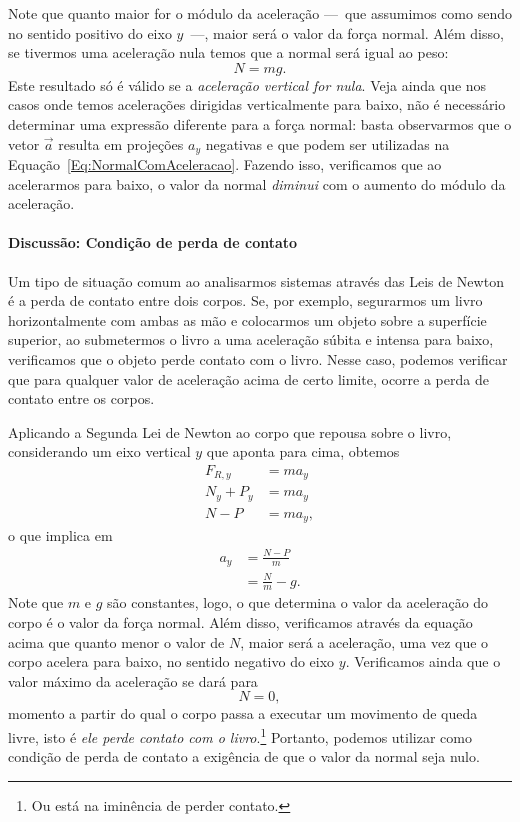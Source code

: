\noindent{}Note que quanto maior for o módulo da aceleração ---~que assumimos como sendo no sentido positivo do eixo $y$~---, maior será o valor da força normal. Além disso, se tivermos uma aceleração nula temos que a normal será igual ao peso:
\begin{equation}
    N = mg.
\end{equation}
%
Este resultado só é válido se a \emph{aceleração vertical for nula}. Veja ainda que nos casos onde temos acelerações dirigidas verticalmente para baixo, não é necessário determinar uma expressão diferente para a força normal: basta observarmos que o vetor $\vec{a}$ resulta em projeções $a_y$ negativas e que podem ser utilizadas na Equação~\eqref{Eq:NormalComAceleracao}. Fazendo isso, verificamos que ao acelerarmos para baixo, o valor da normal \emph{diminui} com o aumento do módulo da aceleração.

\paragraph{Discussão: Condição de perda de contato}
\label{Sec:CondicaoPerdaContato}

Um tipo de situação comum ao analisarmos sistemas através das Leis de Newton é a perda de contato entre dois corpos. Se, por exemplo, segurarmos um livro horizontalmente com ambas as mão e colocarmos um objeto sobre a superfície superior, ao submetermos o livro a uma aceleração súbita e intensa para baixo, verificamos que o objeto perde contato com o livro. Nesse caso, podemos verificar que para qualquer valor de aceleração acima de certo limite, ocorre a perda de contato entre os corpos.

Aplicando a Segunda Lei de Newton ao corpo que repousa sobre o livro, considerando um eixo vertical $y$ que aponta para cima, obtemos
\begin{align}
    F_{R, y} &= m a_y \\
    N_y + P_y &= m a_y \\
    N - P &= m a_y,
\end{align}
%
o que implica em
\begin{align}
    a_y &= \frac{N - P}{m} \\
    &= \frac{N}{m} - g.
\end{align}
%
Note que $m$ e $g$ são constantes, logo, o que determina o valor da aceleração do corpo é o valor da força normal. Além disso, verificamos através da equação acima que quanto menor o valor de $N$, maior será a aceleração, uma vez que o corpo acelera para baixo, no sentido negativo do eixo $y$. Verificamos ainda que o valor máximo da aceleração se dará para 
\begin{equation}
    N = 0,
\end{equation}
%
momento a partir do qual o corpo passa a executar um movimento de queda livre, isto é \emph{ele perde contato com o livro}.\footnote[][-3cm]{Ou está na iminência de perder contato.} Portanto, podemos utilizar como condição de perda de contato a exigência de que o valor da normal seja nulo.

